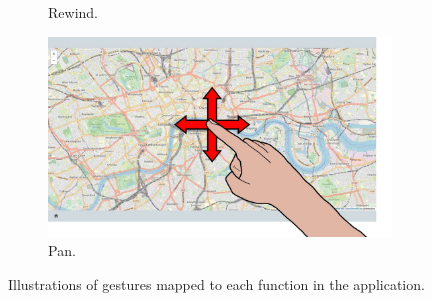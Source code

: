 \begin{figure}[ht]
\begin{subfigure}{.24\textwidth}
        \vspace{-6pt}
        \captionsetup{width=.9\linewidth}
        \caption{Rewind.}
        \label{fig:lui:gestures:rewind}
    \end{subfigure}
    \begin{subfigure}{.24\textwidth}
        \centering
        \includegraphics[width=.97\linewidth]{Figures/LUI/Gestures/pan.pdf}  
        \vspace{-6pt}
        \captionsetup{width=.9\linewidth}
        \caption{Pan.}
        \label{fig:lui:gestures:pan}
    \end{subfigure}
    \vspace{-8pt}
    \caption{Illustrations of gestures mapped to each function in the \lui application.}
    \label{fig:lui:gestures}
\end{figure}

